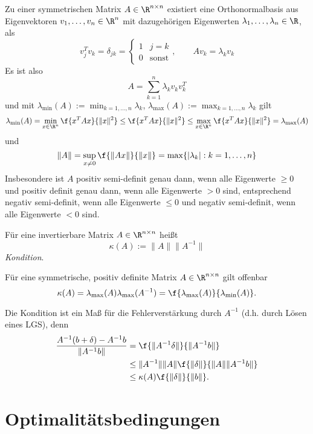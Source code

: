 \documentclass{mycourse}
\begin{document}
\begin{st} \label{2.6}
	Zu einer symmetrischen Matrix $A \in \R^{n\times n}$ existiert eine Orthonormalbasis aus Eigenvektoren $v_1, \dotsc, v_n \in \R^n$ mit dazugehörigen Eigenwerten $\lambda_1, \dotsc, \lambda_n \in \R$, als
	\[
		v_j^T v_k
		= \delta_{jk}
		= \begin{cases}
			1 & j = k \\
			0 & \text{sonst}
		\end{cases},\qquad
		Av_k = \lambda_k v_k
	\]
	Es ist also
	\[
		A = \sum_{k=1}^n \lambda_k v_k v_k^T
	\]
	und mit $\lambda_{\text{min}}(A) := \min_{k=1,\dotsc,n} \lambda_k$, $\lambda_{\text{max}}(A) := \max_{k=1,\dotsc,n} \lambda_k$ gilt
	\[
		\lambda_{\text{min}}(A)
		= \min_{x\in\R^n} \f {x^T A x}{\|x\|^2}
		\le \f {x^T A x}{\|x\|^2}
		\le \max_{x\in\R^n} \f {x^TA x}{\|x\|^2}
		= \lambda_{\text{max}}(A)
	\]
	und
	\[
		\|A\|
		= \sup_{x\neq 0} \f{\|Ax\|}{\|x\|}
		= \max \{|\lambda_k| : k=1, \dotsc, n \}
	\]
	Insbesondere ist $A$ positiv semi-definit genau dann, wenn alle Eigenwerte $\ge 0$ und positiv definit genau dann, wenn alle Eigenwerte $>0$ sind,
	entsprechend negativ semi-definit, wenn alle Eigenwerte $\le 0$ und negativ semi-definit, wenn alle Eigenwerte $<0$ sind.
\end{st}

\begin{df} \label{2.7}
	Für eine invertierbare Matrix $A \in \R^{n\times n}$ heißt
	\[
		\kappa(A)
		:= \|A\| \|A^{-1}\|
	\]
	\emph{Kondition}.

	Für eine symmetrische, positiv definite Matrix $A \in \R^{n\times n}$ gilt offenbar
	\[
		\kappa(A)
		= \lambda_{\text{max}}(A) \lambda_{\text{max}}(A^{-1})
		= \f {\lambda_{\text{max}}(A)}{\lambda_{\text{min}}(A)}.
	\]
\end{df}

\begin{nt} \label{2.8}
	Die Kondition ist ein Maß für die Fehlerverstärkung durch $A^{-1}$ (d.h. durch Lösen eines LGS), denn
	\begin{align*}
		\dfrac {A^{-1}(b+\delta) - A^{-1}b}{\|A^{-1}b\|}
		&= \f {\|A^{-1}\delta\|}{\|A^{-1}b\|} \\
		&\le \|A^{-1}\| \|A\| \f {\|\delta\|}{\|A\|\|A^{-1}b\|} \\
		&\le \kappa(A) \f {\|\delta\|}{\|b\|}.
	\end{align*}
\end{nt}

\section{Optimalitätsbedingungen}
\end{document}
